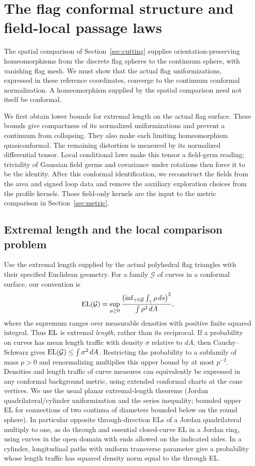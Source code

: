 \section{The flag conformal structure and field-local passage laws}\label{sec:conformal}

The spatial comparison of Section~\ref{sec:cutting} supplies
orientation-preserving homeomorphisms from the discrete flag spheres to the
continuum sphere, with vanishing flag mesh. We must show that the actual
flag uniformizations, expressed in these reference coordinates, converge
to the continuum conformal normalization. A homeomorphism supplied by the
spatial comparison need not itself be conformal.

We first obtain lower bounds for extremal length on the actual flag
surface. These bounds give compactness of its normalized uniformizations
and prevent a continuum from collapsing. They also make each limiting
homeomorphism quasiconformal. The remaining distortion is measured by its
normalized differential tensor. Local conditional laws make this tensor a
field-germ reading; triviality of Gaussian field germs and covariance under
rotations then force it to be the identity. After this conformal
identification, we reconstruct the fields from the area and signed loop
data and remove the auxiliary exploration choices from the profile
kernels. Those field-only kernels are the input to the metric comparison
in Section~\ref{sec:metric}.

\subsection{Extremal length and the local comparison problem}

Use the extremal length supplied by the actual polyhedral flag triangles with their specified
Euclidean geometry. For a family \(\mathcal G\) of curves in a conformal surface, our convention is
\[
 \operatorname{EL}(\mathcal G)=\sup_{\rho\geq0}
 \frac{\bigl(\inf_{\gamma\in\mathcal G}\int_\gamma\rho\,ds\bigr)^2}
 {\int\rho^2\,dA},
\]
where the supremum ranges over measurable densities with positive finite squared integral. Thus
\(\operatorname{EL}\) is extremal \emph{length}, rather than its reciprocal. If a probability on curves has mean
length traffic with density \(\sigma\) relative to \(dA\), then Cauchy--Schwarz gives \(\operatorname{EL}(\mathcal
G)\leq\int\sigma^2\,dA\). Restricting the probability to a subfamily of mass \(p>0\) and
renormalizing multiplies this upper bound by at most \(p^{-2}\). Densities and length traffic of
curve measures can equivalently be expressed in any conformal background metric, using extended
conformal charts at the cone vertices. We use the usual planar extremal-length theorems (Jordan
quadrilateral/cylinder uniformization and the series inequality; bounded upper EL for connections of
two continua of diameters bounded below on the round sphere). In particular opposite
through-direction ELs of a Jordan quadrilateral multiply to one, as do through and essential
closed-curve EL in a Jordan ring, using curves in the open domain with ends allowed on the indicated
sides. In a cylinder, longitudinal paths with uniform transverse parameter give a probability whose
length traffic has squared density norm equal to the through EL.

